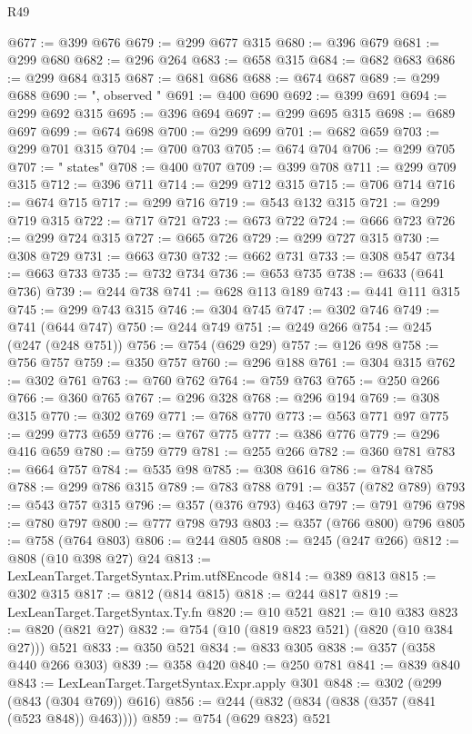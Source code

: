 \begin{lexlean}{R49}
\begin{coremodule}
@677 := @399 @676
@679 := @299 @677 @315
@680 := @396 @679
@681 := @299 @680
@682 := @296 @264
@683 := @658 @315
@684 := @682 @683
@686 := @299 @684 @315
@687 := @681 @686
@688 := @674 @687
@689 := @299 @688
@690 := ", observed "
@691 := @400 @690
@692 := @399 @691
@694 := @299 @692 @315
@695 := @396 @694
@697 := @299 @695 @315
@698 := @689 @697
@699 := @674 @698
@700 := @299 @699
@701 := @682 @659
@703 := @299 @701 @315
@704 := @700 @703
@705 := @674 @704
@706 := @299 @705
@707 := " states"
@708 := @400 @707
@709 := @399 @708
@711 := @299 @709 @315
@712 := @396 @711
@714 := @299 @712 @315
@715 := @706 @714
@716 := @674 @715
@717 := @299 @716
@719 := @543 @132 @315
@721 := @299 @719 @315
@722 := @717 @721
@723 := @673 @722
@724 := @666 @723
@726 := @299 @724 @315
@727 := @665 @726
@729 := @299 @727 @315
@730 := @308 @729
@731 := @663 @730
@732 := @662 @731
@733 := @308 @547
@734 := @663 @733
@735 := @732 @734
@736 := @653 @735
@738 := @633 (@641 @736)
@739 := @244 @738
@741 := @628 @113 @189
@743 := @441 @111 @315
@745 := @299 @743 @315
@746 := @304 @745
@747 := @302 @746
@749 := @741 (@644 @747)
@750 := @244 @749
@751 := @249 @266
@754 := @245 (@247 (@248 @751))
@756 := @754 (@629 @29)
@757 := @126 @98
@758 := @756 @757
@759 := @350 @757
@760 := @296 @188
@761 := @304 @315
@762 := @302 @761
@763 := @760 @762
@764 := @759 @763
@765 := @250 @266
@766 := @360 @765
@767 := @296 @328
@768 := @296 @194
@769 := @308 @315
@770 := @302 @769
@771 := @768 @770
@773 := @563 @771 @97
@775 := @299 @773 @659
@776 := @767 @775
@777 := @386 @776
@779 := @296 @416 @659
@780 := @759 @779
@781 := @255 @266
@782 := @360 @781
@783 := @664 @757
@784 := @535 @98
@785 := @308 @616
@786 := @784 @785
@788 := @299 @786 @315
@789 := @783 @788
@791 := @357 (@782 @789)
@793 := @543 @757 @315
@796 := @357 (@376 @793) @463
@797 := @791 @796
@798 := @780 @797
@800 := @777 @798 @793
@803 := @357 (@766 @800) @796
@805 := @758 (@764 @803)
@806 := @244 @805
@808 := @245 (@247 @266)
@812 := @808 (@10 @398 @27) @24
@813 := LexLeanTarget.TargetSyntax.Prim.utf8Encode
@814 := @389 @813
@815 := @302 @315
@817 := @812 (@814 @815)
@818 := @244 @817
@819 := LexLeanTarget.TargetSyntax.Ty.fn
@820 := @10 @521
@821 := @10 @383
@823 := @820 (@821 @27)
@832 := @754 (@10 (@819 @823 @521) (@820 (@10 @384 @27))) @521
@833 := @350 @521
@834 := @833 @305
@838 := @357 (@358 @440 @266 @303)
@839 := @358 @420
@840 := @250 @781
@841 := @839 @840
@843 := LexLeanTarget.TargetSyntax.Expr.apply @301
@848 := @302 (@299 (@843 (@304 @769)) @616)
@856 := @244 (@832 (@834 (@838 (@357 (@841 (@523 @848)) @463))))
@859 := @754 (@629 @823) @521

\end{coremodule}
\end{lexlean}
